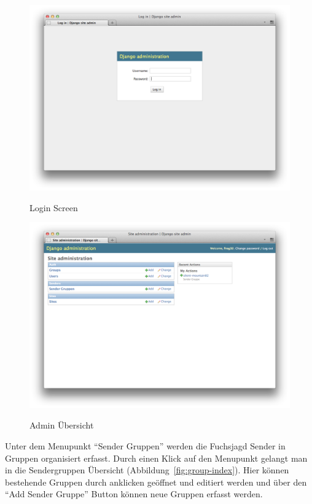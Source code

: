 \begin{figure}[H]
	\centering			      
        \includegraphics[scale=0.35]{images/admin-login.png}\\
		\caption{Login Screen}
	\label{fig:admin-login}
\end{figure}

\begin{figure}[H]
	\centering			      
        \includegraphics[scale=0.35]{images/admin-index.png}\\
		\caption{Admin Übersicht}
	\label{fig:admin-index}
\end{figure}

Unter dem Menupunkt "`Sender Gruppen"' werden die Fuchsjagd Sender in Gruppen organisiert erfasst. Durch einen Klick auf den Menupunkt gelangt man in die Sendergruppen Übersicht (Abbildung~\ref{fig:group-index}). Hier können bestehende Gruppen durch anklicken geöffnet und editiert werden und über den "`Add Sender Gruppe"' Button können neue Gruppen erfasst werden.

